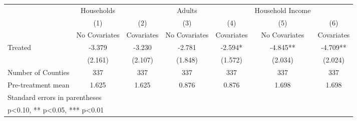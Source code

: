 {
\def\sym#1{\ifmmode^{#1}\else\(^{#1}\)\fi}
\begin{tabular}{l*{6}{c}}
\hline\hline
            &  Households   &               &      Adults   &               &Household Income   &               \\
            &\multicolumn{1}{c}{(1)}&\multicolumn{1}{c}{(2)}&\multicolumn{1}{c}{(3)}&\multicolumn{1}{c}{(4)}&\multicolumn{1}{c}{(5)}&\multicolumn{1}{c}{(6)}\\
            &\multicolumn{1}{c}{No Covariates}&\multicolumn{1}{c}{Covariates}&\multicolumn{1}{c}{No Covariates}&\multicolumn{1}{c}{Covariates}&\multicolumn{1}{c}{No Covariates}&\multicolumn{1}{c}{Covariates}\\
\hline
Treated     &      -3.379   &      -3.230   &      -2.781   &      -2.594*  &      -4.845** &      -4.709** \\
            &     (2.161)   &     (2.107)   &     (1.848)   &     (1.572)   &     (2.034)   &     (2.024)   \\
\hline
Number of Counties&         337   &         337   &         337   &         337   &         337   &         337   \\
Pre-treatment mean&       1.625   &       1.625   &       0.876   &       0.876   &       1.698   &       1.698   \\
\hline\hline
\multicolumn{7}{l}{\footnotesize Standard errors in parentheses}\\
\multicolumn{7}{l}{\footnotesize * p<0.10, ** p<0.05, *** p<0.01}\\
\end{tabular}
}

